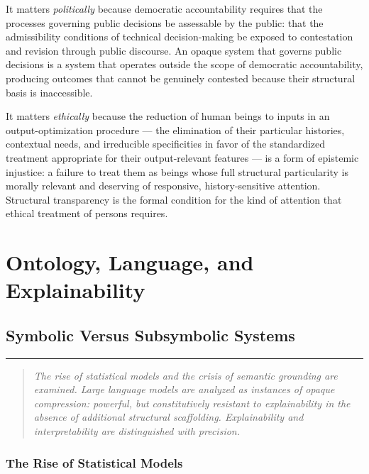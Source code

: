 \documentclass[12pt,openany]{book}
\theoremstyle{plain}
\theoremstyle{definition}
\theoremstyle{remark}
\newcommand{\chapterrule}{%
  \vspace{4pt}%
  {\color{SpherepopBlue}\rule{\textwidth}{0.8pt}}%
  \vspace{10pt}%
}
\newenvironment{chapterprecis}{%
  \begin{quote}\small\itshape}{%
  \end{quote}\medskip}
\begin{document}
It matters \emph{politically} because democratic accountability requires that the processes governing public decisions be assessable by the public: that the admissibility conditions of technical decision-making be exposed to contestation and revision through public discourse. An opaque system that governs public decisions is a system that operates outside the scope of democratic accountability, producing outcomes that cannot be genuinely contested because their structural basis is inaccessible.

It matters \emph{ethically} because the reduction of human beings to inputs in an output-optimization procedure — the elimination of their particular histories, contextual needs, and irreducible specificities in favor of the standardized treatment appropriate for their output-relevant features — is a form of epistemic injustice: a failure to treat them as beings whose full structural particularity is morally relevant and deserving of responsive, history-sensitive attention. Structural transparency is the formal condition for the kind of attention that ethical treatment of persons requires.

 \clearpage

\part{Ontology, Language, and Explainability}

\chapter{Symbolic Versus Subsymbolic Systems}
\chapterrule

\begin{chapterprecis}
The rise of statistical models and the crisis of semantic
grounding are examined. Large language models are analyzed as
instances of opaque compression: powerful, but constitutively
resistant to explainability in the absence of additional
structural scaffolding. Explainability and interpretability are
distinguished with precision.
\end{chapterprecis}

\section{The Rise of Statistical Models}
\end{document}
